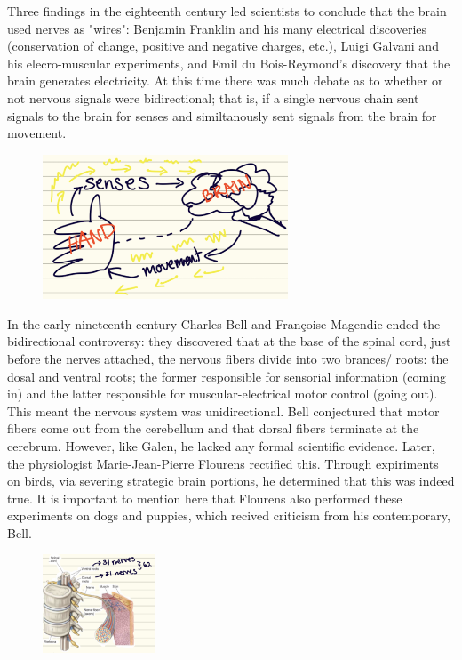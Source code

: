 
Three findings in the eighteenth century led scientists to conclude that the brain used nerves as "wires": Benjamin Franklin and his many electrical discoveries (conservation of change, positive and negative charges, etc.), Luigi Galvani and his elecro-muscular experiments, and Emil du Bois-Reymond's discovery that the brain generates electricity. At this time there was much debate as to whether or not nervous signals were bidirectional; that is, if a single nervous chain sent signals to the brain for senses and similtanously sent signals from the brain for movement.

\begin{figure}[H]
  \begin{center}
    \includegraphics[width=0.65\textwidth]{figures/bidirectional}
  \end{center}
  \caption{}\label{fig:}
\end{figure}

In the early nineteenth century Charles Bell and Fran\c{c}oise Magendie ended the bidirectional controversy: they discovered that at the base of the spinal cord, just before the nerves attached, the nervous fibers divide into two brances/ roots: the dosal and ventral roots; the former responsible for sensorial information (coming in) and the latter responsible for muscular-electrical motor control (going out). This meant the nervous system was unidirectional. Bell conjectured that motor fibers come out from the cerebellum and that dorsal fibers terminate at the cerebrum. However, like Galen, he lacked any formal scientific evidence. Later, the physiologist Marie-Jean-Pierre Flourens rectified this. Through expiriments on birds, via severing strategic brain portions, he determined that this was indeed true. It is important to mention here that Flourens also performed these experiments on dogs and puppies, which recived criticism from his contemporary, Bell. 

\begin{figure}[H]
  \begin{center}
    \includegraphics[width=0.30\textwidth]{figures/nervesplit}
  \end{center}
  \caption{}\label{fig:}
\end{figure}




